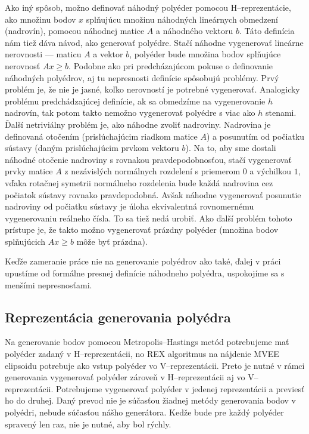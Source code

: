 Ako iný spôsob, možno definovať náhodný polyéder pomocou H--reprezentácie, ako množinu bodov $x$ splňujúcu množinu náhodných lineárnych obmedzení (nadrovín), pomocou náhodnej matice $A$ a náhodného vektoru $b$. Táto definícia nám tiež dáva návod, ako generovať polyédre. Stačí náhodne vygenerovať lineárne nerovnosti --- maticu $A$ a vektor $b$, polyéder bude množina bodov splňujúce nerovnosť $Ax\geq b$. Podobne ako pri predcházajúcom pokuse o definovanie náhodných polyédrov, aj tu nepresnosti definície spôsobujú problémy. Prvý problém je, že nie je jasné, koľko nerovností je potrebné vygenerovať. Analogicky problému predchádzajúcej definície, ak sa obmedzíme na vygenerovanie $h$ nadrovín, tak potom takto nemožno vygenerovať polyédre s viac ako $h$ stenami.
Ďalší netriviálny problém je, ako náhodne zvoliť nadroviny. Nadrovina je definovaná otočením (prislúchajúcim riadkom matice $A$) a posunutím od počiatku sústavy (daným prislúchajúcim prvkom vektoru $b$). Na to, aby sme dostali náhodné otočenie nadroviny s rovnakou pravdepodobnosťou, stačí vygenerovať prvky matice $A$ z nezávislých normálnych rozdelení s priemerom $0$ a výchilkou $1$, vďaka rotačnej symetrii normálneho rozdelenia bude každá nadrovina cez počiatok sústavy rovnako pravdepodobná. Avšak náhodne vygenerovať posunutie nadroviny od počiatku sústavy je úloha ekvivalentná rovnomernému vygenerovaniu reálneho čísla. To sa tiež nedá urobiť. Ako ďalší problém tohoto prístupe je, že takto možno vygenerovať prázdny polyéder (množina bodov splňujúcich $Ax \geq b$ môže byť prázdna).

Keďže zameranie práce nie na generovanie polyédrov ako také, ďalej v práci upustíme od formálne presnej definície náhodneho polyédra, uspokojíme sa s menšími nepresnosťami.\\

\subsection{Reprezentácia generovania polyédra}
Na generovanie bodov pomocou Metropolis--Hastings metód potrebujeme mať polyéder zadaný v H--reprezentácii, no REX algoritmus na nájdenie MVEE elipsoidu potrebuje ako vstup polyéder vo V--reprezentácii. Preto je nutné v rámci generovania vygenerovať polyéder zároveň v H--reprezentácii aj vo V--reprezentácii. Potrebujeme vygenerovať polyéder v jedenej reprezentácii a previesť ho do druhej. Daný prevod nie je súčasťou žiadnej metódy generovania bodov v polyédri, nebude súčasťou nášho generátora. Kedže bude pre každý polyéder spravený len raz, nie je nutné, aby bol rýchly.\\

